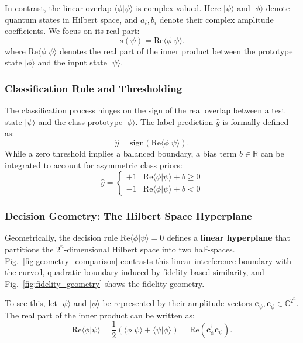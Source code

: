 \documentclass[conference]{IEEEtran}
\begin{document}
In contrast, the linear overlap $\langle \phi | \psi \rangle$ is complex-valued. Here $|\psi\rangle$ and $|\phi\rangle$ denote quantum states in Hilbert space, and $a_i, b_i$ denote their complex amplitude coefficients. We focus on its real part:
\begin{equation}
s(\psi) = \mathrm{Re}\langle \phi | \psi \rangle.
\end{equation}
where $\mathrm{Re}\langle \phi | \psi \rangle$ denotes the real part of the inner product between the prototype state $|\phi\rangle$ and the input state $|\psi\rangle$.

\subsubsection{Classification Rule and Thresholding}
The classification process hinges on the sign of the real overlap between a test state $|\psi\rangle$ and the class prototype $|\phi\rangle$. The label prediction $\hat{y}$ is formally defined as:
\begin{equation}
\hat{y} = \text{sign}\left( \mathrm{Re}\langle \phi | \psi \rangle \right).
\end{equation}
While a zero threshold implies a balanced boundary, a bias term $b \in \mathbb{R}$ can be integrated to account for asymmetric class priors:
\begin{equation}
\hat{y} = \begin{cases} +1 & \mathrm{Re}\langle \phi | \psi \rangle + b \geq 0 \\ -1 & \mathrm{Re}\langle \phi | \psi \rangle + b < 0 \end{cases}
\end{equation}

\subsubsection{Decision Geometry: The Hilbert Space Hyperplane}
Geometrically, the decision rule $\mathrm{Re}\langle \phi | \psi \rangle = 0$ defines a \textbf{linear hyperplane} that partitions the $2^n$-dimensional Hilbert space into two half-spaces. Fig.~\ref{fig:geometry_comparison} contrasts this linear-interference boundary with the curved, quadratic boundary induced by fidelity-based similarity, and Fig.~\ref{fig:fidelity_geometry} shows the fidelity geometry.

To see this, let $|\psi\rangle$ and $|\phi\rangle$ be represented by their amplitude vectors $\mathbf{c}_\psi, \mathbf{c}_\phi \in \mathbb{C}^{2^n}$. The real part of the inner product can be written as:
\begin{equation}
\mathrm{Re}\langle \phi | \psi \rangle = \frac{1}{2}\left( \langle \phi | \psi \rangle + \langle \psi | \phi \rangle \right) = \text{Re}(\mathbf{c}_\phi^\dagger \mathbf{c}_\psi).
\end{equation}
\end{document}

